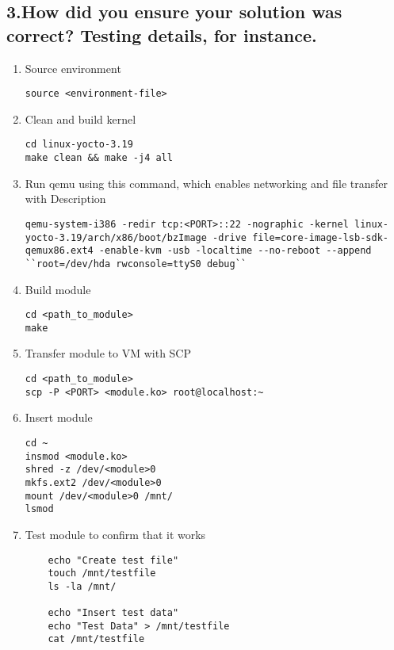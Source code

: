 \documentclass[letterpaper,10pt,fleqn]{article}
\begin{document}
	\subsection*{3.How did you ensure your solution was correct? Testing details, for instance.}
	\begin{enumerate}

	\item Source environment
	\begin{lstlisting}
source <environment-file>
\end{lstlisting}

	\item Clean and build kernel
	\begin{lstlisting}
cd linux-yocto-3.19
make clean && make -j4 all
\end{lstlisting}

	\item Run qemu using this command, which enables networking and file transfer with Description
	\begin{lstlisting}
qemu-system-i386 -redir tcp:<PORT>::22 -nographic -kernel linux-yocto-3.19/arch/x86/boot/bzImage -drive file=core-image-lsb-sdk-qemux86.ext4 -enable-kvm -usb -localtime --no-reboot --append ``root=/dev/hda rwconsole=ttyS0 debug``
\end{lstlisting}

\item Build module
\begin{lstlisting}
cd <path_to_module>
make
\end{lstlisting}

	\item Transfer module to VM with SCP
	\begin{lstlisting}
cd <path_to_module>
scp -P <PORT> <module.ko> root@localhost:~
\end{lstlisting}

	\item Insert module
	\begin{lstlisting}
cd ~
insmod <module.ko>
shred -z /dev/<module>0
mkfs.ext2 /dev/<module>0
mount /dev/<module>0 /mnt/
lsmod
\end{lstlisting}

	\item Test module to confirm that it works
	\begin{lstlisting}
	echo "Create test file"
	touch /mnt/testfile
	ls -la /mnt/

	echo "Insert test data"
	echo "Test Data" > /mnt/testfile
	cat /mnt/testfile


\end{lstlisting}
\end{enumerate}
\end{document}
